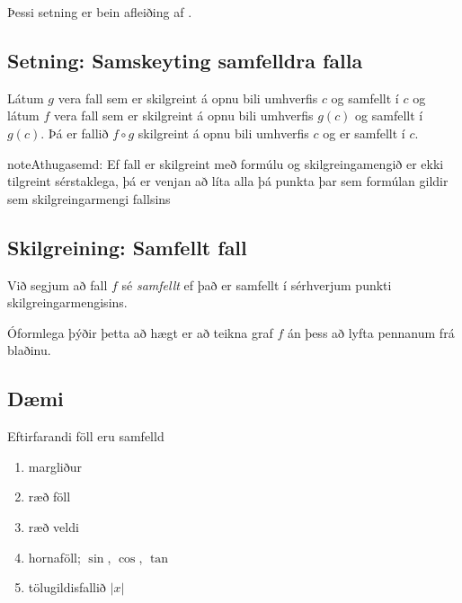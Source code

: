 \documentclass[a4paper,10pt,icelandic]{sphinxmanual}
\begin{document}
Þessi setning er bein afleiðing af {\hyperref[kafli02:setning\string-markgildi]{}}.


\subsection{Setning: Samskeyting samfelldra falla}
\label{kafli02:setning-samskeyting-samfelldra-falla}
Látum \(g\) vera fall sem er skilgreint á opnu bili umhverfis
\(c\) og samfellt í \(c\) og látum \(f\) vera fall sem er
skilgreint á opnu bili umhverfis \(g(c)\) og samfellt í
\(g(c)\). Þá er fallið \(f\circ g\) skilgreint á opnu bili
umhverfis \(c\) og er samfellt í \(c\).

\begin{notice}{note}{Athugasemd:}
Ef fall er skilgreint með formúlu og skilgreingamengið er ekki tilgreint
sérstaklega, þá er venjan að líta alla þá punkta þar sem formúlan gildir
sem skilgreingarmengi fallsins
\end{notice}


\subsection{Skilgreining: Samfellt fall}
\label{kafli02:index-9}\label{kafli02:skilgrsamfellt}\label{kafli02:skilgreining-samfellt-fall}
Við segjum að fall \(f\) sé \textit{samfellt} ef það er samfellt í
sérhverjum punkti skilgreingarmengisins.

Óformlega þýðir þetta að hægt er að teikna graf \(f\) án þess að lyfta pennanum frá blaðinu.


\subsection{Dæmi}
\label{kafli02:id13}
Eftirfarandi föll eru samfelld
\begin{enumerate}
\item {} 
margliður

\item {} 
ræð föll

\item {} 
ræð veldi

\item {} 
hornaföll; \(\sin\), \(\cos\), \(\tan\)

\item {} 
tölugildisfallið \(|x|\)

\end{enumerate}
\end{document}
